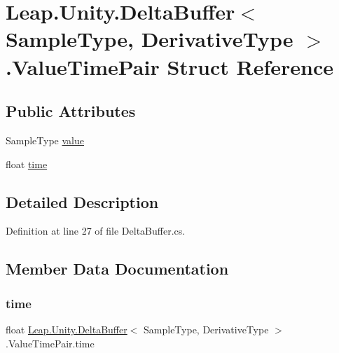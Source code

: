 \hypertarget{struct_leap_1_1_unity_1_1_delta_buffer_1_1_value_time_pair}{}\section{Leap.\+Unity.\+Delta\+Buffer$<$ Sample\+Type, Derivative\+Type $>$.Value\+Time\+Pair Struct Reference}
\label{struct_leap_1_1_unity_1_1_delta_buffer_1_1_value_time_pair}
\subsection*{Public Attributes}
\begin{DoxyCompactItemize}
\item 
Sample\+Type \mbox{\hyperlink{struct_leap_1_1_unity_1_1_delta_buffer_1_1_value_time_pair_a85890d19a99a8075ae2bdda548d456e5}{value}}
\item 
float \mbox{\hyperlink{struct_leap_1_1_unity_1_1_delta_buffer_1_1_value_time_pair_ad2376de3a27c8a7a08935f95762851bb}{time}}
\end{DoxyCompactItemize}


\subsection{Detailed Description}


Definition at line 27 of file Delta\+Buffer.\+cs.



\subsection{Member Data Documentation}
\mbox{\label{struct_leap_1_1_unity_1_1_delta_buffer_1_1_value_time_pair_ad2376de3a27c8a7a08935f95762851bb}} 
\subsubsection{\texorpdfstring{time}{time}}
{\footnotesize\ttfamily float \mbox{\hyperlink{class_leap_1_1_unity_1_1_delta_buffer}{Leap.\+Unity.\+Delta\+Buffer}}$<$ Sample\+Type, Derivative\+Type $>$.Value\+Time\+Pair.\+time}



